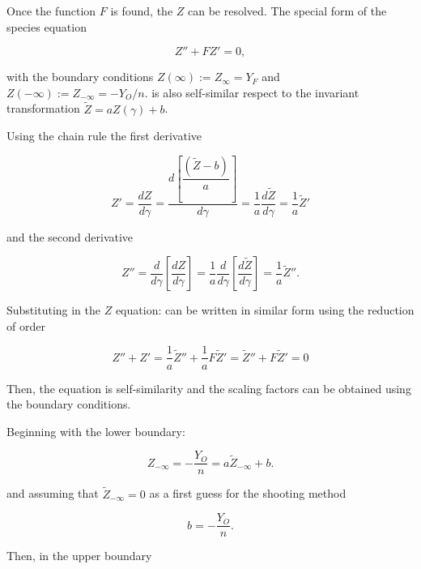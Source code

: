 Once the function $F$ is found, 
the $Z$ can be resolved. 
The special form of the species equation

\begin{equation*}
    Z''+FZ'=0 ,
\end{equation*}

with the  boundary conditions 
$Z(\infty):=Z_\infty=Y_F$ and $Z(-\infty):=Z_{-\infty}=-Y_O/n$. 
is also self-similar respect 
to the invariant transformation $\tilde{Z}=aZ(\gamma)+b$. 

Using the chain rule the 
first derivative  

\begin{equation}
   Z'
   =
   \frac{d Z}{d \gamma} 
   =
   \dfrac{d \left[\dfrac{(\tilde{Z}-b)}{a}\right]}{d \gamma} 
   =
   \frac{1}{a}
    \dfrac{d\tilde{Z}}{d \gamma} 
    =
   \frac{1}{a}
    \tilde{Z}'
\end{equation}

and the second derivative

\begin{equation}
   Z''
   =
   \frac{d }{d \gamma} 
   \left[
    \frac{d Z}{d \gamma} 
   \right]
   =
   \frac{1}{a}
   \frac{d }{d \gamma} 
   \left[
    \dfrac{d\tilde{Z}}{d \gamma} 
   \right]
    =
   \frac{1}{a}
    \tilde{Z}''
    .
\end{equation}

Substituting in the $Z$ equation:
can be written in similar form using the reduction of order  

\begin{equation}
    Z''
    +
    Z' 
    =
   \frac{1}{a}
    \tilde{Z}''
    +
   \frac{1}{a}
    F\tilde{Z}'
    =
    \tilde{Z}''
    +
    F\tilde{Z}'
    =
    0
\end{equation}

Then, the equation is self-similarity and the scaling factors
can be obtained using the boundary conditions. 

Beginning with the lower boundary:

\begin{equation}
    Z_{-\infty}=-\frac{Y_O}{n}=a\tilde{Z}_{-\infty} +b .
\end{equation}

and  assuming that $\tilde{Z}_{-\infty}=0$ as a first guess for the shooting method

\begin{equation}
b=-\frac{Y_O}{n} .
\end{equation}

Then, in the upper boundary

